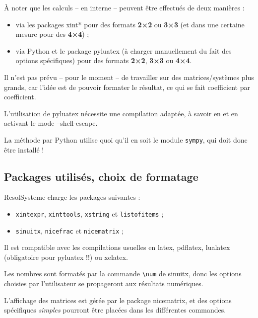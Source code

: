 \documentclass[french,a4paper,11pt]{article}
\begin{document}
\begin{importantblock}
À noter que les calculs -- en interne -- peuvent être effectués de deux manières :

\begin{itemize}
	\item via les packages \textsf{xint*} pour des formats \textbf{2×2} ou \textbf{3×3} (et dans une certaine mesure pour des \textbf{4×4}) ;
	\item via \textsf{Python} et le package \textsf{pyluatex} (à charger manuellement du fait des options spécifiques) pour des formats \textbf{2×2}, \textbf{3×3} ou \textbf{4×4}.
\end{itemize}

Il n'est pas prévu -- pour le moment -- de travailler sur des matrices/systèmes plus grands, car l'idée est de pouvoir formater le résultat, ce qui se fait coefficient par coefficient.
\end{importantblock}

\begin{warningblock}
L'utilisation de \textsf{pyluatex} nécessite une compilation adaptée, à savoir en  et en activant le mode \textsf{--shell-escape}. 

\smallskip

La méthode par \textsf{Python} utilise quoi qu'il en soit le module \texttt{sympy}, qui doit donc être installé !
\end{warningblock}

\subsection{Packages utilisés, choix de formatage}

\begin{noteblock}
\textsf{ResolSysteme} charge les packages suivantes :

\begin{itemize}
	\item \texttt{xintexpr}, \texttt{xinttools}, \texttt{xstring} et \texttt{listofitems} ;
	\item \texttt{sinuitx}, \texttt{nicefrac} et \texttt{nicematrix} ;
\end{itemize}

Il est compatible avec les compilations usuelles en \textsf{latex}, \textsf{pdflatex}, \textsf{lualatex} (obligatoire pour \textsf{pyluatex} !!) ou \textsf{xelatex}.
\end{noteblock}

\begin{importantblock}
Les nombres sont formatés par la commande \texttt{\textbackslash num} de \textsf{sinuitx}, donc les options choisies par l'utilisateur se propageront aux résultats numériques.

\smallskip

L'affichage des matrices est gérée par le package \textsf{nicematrix}, et des options spécifiques \textit{simples} pourront être placées dans les différentes commandes.
\end{importantblock}
\end{document}
